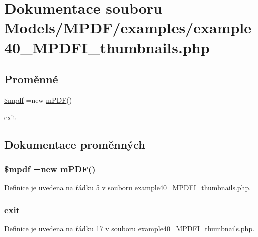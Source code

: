\hypertarget{example40___m_p_d_f_i__thumbnails_8php}{\section{Dokumentace souboru Models/\-M\-P\-D\-F/examples/example40\-\_\-\-M\-P\-D\-F\-I\-\_\-thumbnails.php}
\label{example40___m_p_d_f_i__thumbnails_8php}
}
\subsection*{Proměnné}
\begin{DoxyCompactItemize}
\item 
\hyperlink{example40___m_p_d_f_i__thumbnails_8php_ad028f81910d6cbab9b184d2214b3a8f8}{\$mpdf} =new \hyperlink{classm_p_d_f}{m\-P\-D\-F}()
\item 
\hyperlink{example40___m_p_d_f_i__thumbnails_8php_a6733eb5f605d09eaede9845835d71c4e}{exit}
\end{DoxyCompactItemize}


\subsection{Dokumentace proměnných}
\hypertarget{example40___m_p_d_f_i__thumbnails_8php_ad028f81910d6cbab9b184d2214b3a8f8}{
\subsubsection[{\$mpdf}]{\setlength{\rightskip}{0pt plus 5cm}\$mpdf =new {\bf m\-P\-D\-F}()}}\label{example40___m_p_d_f_i__thumbnails_8php_ad028f81910d6cbab9b184d2214b3a8f8}


Definice je uvedena na řádku 5 v souboru example40\-\_\-\-M\-P\-D\-F\-I\-\_\-thumbnails.\-php.

\hypertarget{example40___m_p_d_f_i__thumbnails_8php_a6733eb5f605d09eaede9845835d71c4e}{
\subsubsection[{exit}]{\setlength{\rightskip}{0pt plus 5cm}exit}}\label{example40___m_p_d_f_i__thumbnails_8php_a6733eb5f605d09eaede9845835d71c4e}


Definice je uvedena na řádku 17 v souboru example40\-\_\-\-M\-P\-D\-F\-I\-\_\-thumbnails.\-php.

